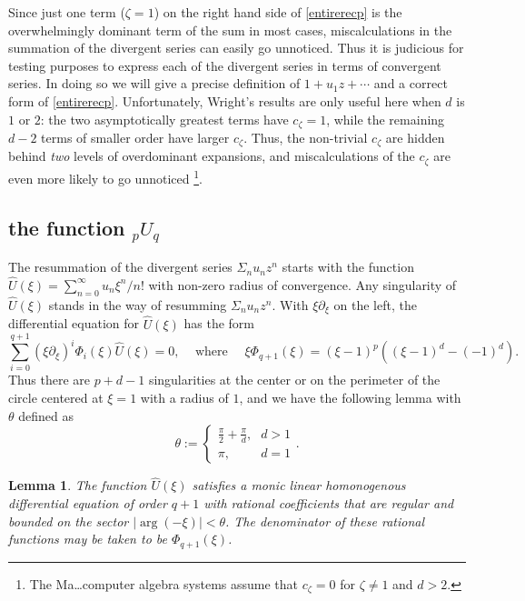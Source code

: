 \documentclass[12pt]{article}
\numberwithin{equation}{section}
\newtheorem{lemma}[theorem]{Lemma}
\begin{document}
Since just one term ($\zeta=1$) on the right hand side of \eqref{entirerecp} is the overwhelmingly dominant term of the sum in most cases, miscalculations in the summation of the divergent series can easily go unnoticed. Thus it is judicious for testing purposes to express each of the divergent series in terms of convergent series. In doing so we will give a precise definition of $1 + u_1 z + \cdots$ and a correct form of \eqref{entirerecp}. Unfortunately, Wright's results are only useful here when $d$ is $1$ or $2$: the two asymptotically greatest terms have $c_{\zeta}=1$, while the remaining $d-2$ terms of smaller order have larger $c_{\zeta}$. Thus, the non-trivial $c_{\zeta}$ are hidden behind \emph{two} levels of overdominant expansions, and miscalculations of the $c_{\zeta}$ are even more likely to go unnoticed \footnote{The Ma\dots computer algebra systems assume that $c_\zeta = 0$ for $\zeta \neq 1$ and $d>2$.}.

\subsection{the function ${}_p U_q$}
The resummation of the divergent series $\Sigma_n u_n z^n$ starts with the function $\hat{U}(\xi) = \sum_{n=0}^{\infty} u_n \xi^n/n!$ with non-zero radius of convergence. Any singularity of $\hat{U}(\xi)$ stands in the way of resumming $\Sigma_n u_n z^n$. With $\xi \partial_{\xi}$ on the left, the differential equation for $\hat{U}(\xi)$ has the form
\begin{equation*}
\sum_{i=0}^{q+1} (\xi \partial_\xi)^i \Phi_{i}(\xi)\hat{U}(\xi) = 0\text{,} \quad \text{ where } \quad \xi \Phi_{q+1}(\xi) = (\xi-1)^p ((\xi-1)^d-(-1)^d)\text{.}
\end{equation*}
Thus there are $p+d-1$ singularities at the center or on the perimeter of the circle centered at $\xi=1$ with a radius of $1$, and we have the following lemma with $\theta$ defined as
\begin{equation*}
\theta := \begin{cases}
\frac{\pi}{2} + \frac{\pi}{d}\text{,} & d > 1\\
\pi\text{,} & d = 1
\end{cases}\text{.}
\end{equation*}
\begin{lemma}
The function $\hat{U}(\xi)$ satisfies a monic linear homonogenous differential equation of order $q+1$ with rational coefficients that are regular and bounded on the sector $|\arg(-\xi)| < \theta$. The denominator of these rational functions may be taken to be $\Phi_{q+1}(\xi)$.
\end{lemma}
\end{document}

